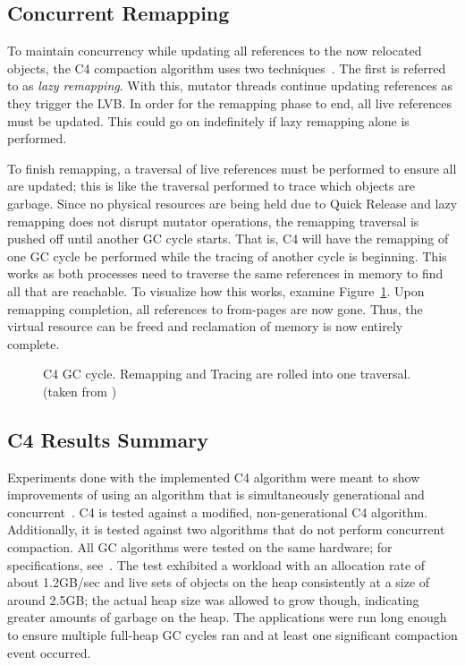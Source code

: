\documentclass{sig-alternate}
\begin{document}
\subsection{Concurrent Remapping}
\label{sec:c4Remapping}

To maintain concurrency while updating all references to the now relocated
objects, the C4 compaction algorithm uses two techniques~\cite{Tene:C4}. The first is
referred to as \emph{lazy remapping}. With this, mutator
threads continue updating references as they trigger the LVB. In order for
the remapping phase to end, all live references must be updated.
This could go on indefinitely if lazy remapping alone is performed.

To finish remapping, a traversal of live references must be performed to
ensure all are updated; this is like the traversal performed to trace which
objects are garbage. Since no physical resources are being held due
to Quick Release and lazy remapping does not disrupt mutator operations,
the remapping traversal is pushed off until another GC cycle starts. That
is, C4 will have the remapping of one GC cycle be performed while the tracing
of another cycle is beginning. This works as both processes need to traverse
the same references in memory to find all that are reachable. To
visualize how this works, examine Figure~\ref{fig:c4Cycle}. Upon remapping completion, 
all references to from-pages are now gone. Thus, the virtual resource
can be freed and reclamation of memory is now entirely complete. 

\begin{figure}
\centering
{}
\caption{C4 GC cycle. Remapping and Tracing are rolled into one traversal.
(taken from \cite{Tene:C4})}
\label{fig:c4Cycle}
\end{figure}


\subsection{C4 Results Summary}
\label{sec:c4Results}

Experiments done with the implemented C4 algorithm were meant to show improvements
of using an algorithm that is simultaneously generational and concurrent~\cite{Tene:C4}.
C4 is tested against a modified, non-generational C4 algorithm. Additionally,
it is tested against two algorithms that do not perform concurrent compaction. 
All GC algorithms were tested on the same hardware; for specifications, see~\cite{Tene:C4}. 
The test exhibited a workload with
an allocation rate of about 1.2GB/sec and live sets of objects on 
the heap consistently at a size of around 2.5GB; the actual heap size was allowed 
to grow though, indicating greater amounts of garbage on the heap. The applications were run long
enough to ensure multiple full-heap GC cycles ran and at least one
significant compaction event occurred.
\end{document}
